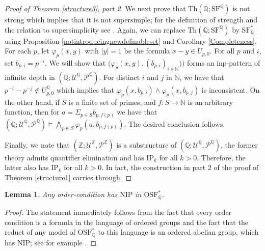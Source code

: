 \documentclass[letterpaper]{amsart}
\newcommand{\qq}{\mathbb{Q}}
\newcommand{\nn}{\mathbb{N}}
\newcommand{\zz}{\mathbb{Z}}
\newcommand{\sU}{\mathscr{U}}
\newcommand{\sP}{\mathscr{P}}
\newcommand{\SQ}{\mathrm{SF}^\qq}
\newcommand{\TSFQ}{\mathrm{SF}^*_{\qq}}
\newcommand{\TOSFQ}{\mathrm{OSF}^*_{\qq}}
\newtheorem{lem}[thm]{Lemma}
\begin{document}
\begin{proof}[Proof of Theorem \ref{structure3}, part 2]
 
We next prove that $\text{Th}( \qq; \SQ)$ is not strong which implies that it is not supersimple;  for the definition of strength and the relation to supersimplicity see \cite{Adler}. Again, we can replace $\text{Th}( \qq; \SQ)$ by $\TSFQ$ using Proposition \ref{notintroducingnewdefinableset} and Corollary \ref{Completeness}.  For each $p$, let $\varphi_p(x,y)$ with $|y|=1$ be the formula $x-y \in U_{p,0}$.   
For all $p$ and $i$, set $b_{p,i} = p^{-i}$. We will show that $\big( \varphi_p(x,y),  ( b_{p,i})_{i \in \nn}   )     \big)$ forms an inp-pattern of infinite depth in $(\qq; \sU^\qq, \sP^\qq)$.  For distinct $i$ and $j$ in $\nn$, we have that $p^{-i} - p^{-j} \notin U^\qq_{p,0}$ which implies that $\varphi_p(x, b_{p,i}) \wedge \varphi_p(x, b_{p,j}) $ is inconsistent. On the other hand, if $S$ is a finite set of primes, and $f: S \to \nn$ is an arbitrary function, then for $a=\Sigma_{p\in S}b_{p,f(p)}$ we have that $(\qq; \sU^\qq, \sP^\qq)\models \bigwedge_{p \in S} \varphi_p(a, b_{p,f(p)})$. The desired conclusion follows.

Finally, we note that $(\zz; \sU^\zz, \sP^\zz)$ is a substructure of  $(\qq; \sU^\qq, \sP^\qq)$, the former theory admits quantifier elimination and has $\text{IP}_k$ for all $k>0$.  Therefore, the latter also has $\text{IP}_k$ for all $k>0$. In fact, the construction in part 2 of the proof of Theorem \ref{structure1} carries through.
\end{proof}

\begin{lem}\label{NIPoforderformula}
Any order-condition has $\mathrm{NIP}$ in $\TOSFQ$.
\end{lem}
\begin{proof}
The statement immediately follows from the fact that every order condition is a formula in the language of ordered groups and the fact that the reduct of any model of  $\TOSFQ$ to this language is an ordered abelian group, which has $\text{NIP}$; see for example \cite{Gurevich}.
\end{proof}
\end{document}
